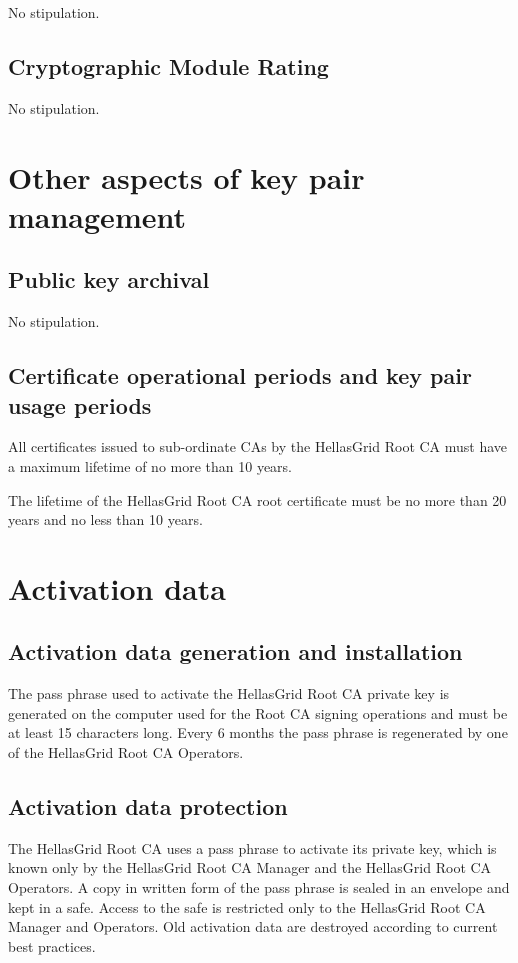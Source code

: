 \documentclass[11pt,a4paper,titlepage]{book}
\begin{document}
No stipulation.

\subsection{Cryptographic Module Rating}

No stipulation.

\section{Other aspects of key pair management}


\subsection{Public key archival}

No stipulation.

\subsection{Certificate operational periods and key pair usage periods}

All certificates issued to sub-ordinate CAs by the HellasGrid Root CA must have a maximum lifetime of no more than 10 years.

The lifetime of the HellasGrid Root CA root certificate must be no more than 20 years and no less than 10 years.

\section{Activation data}
\subsection{Activation data generation and installation}


The pass phrase used to activate the HellasGrid Root CA private key is generated on the computer used for the Root CA signing operations and must be at least 15 characters long. Every 6 months the pass phrase is regenerated by one of the HellasGrid Root CA Operators.


\subsection{Activation data protection}

The HellasGrid Root CA uses a pass phrase to activate its private key, which is known only by the HellasGrid Root CA Manager and the HellasGrid Root CA Operators. A copy in written form of the pass phrase is sealed in an envelope and kept in a safe. Access to the safe is restricted only to the HellasGrid Root CA Manager and Operators. Old activation data are destroyed according to current best practices.
\end{document}
